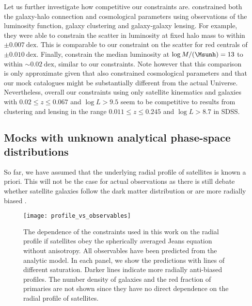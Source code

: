 \documentclass[fleqn,usenatbib,useAMS]{mnras}
\begin{document}
	Let us further investigate how competitive our constraints are. \cite{Cacciato+13} constrained both the galaxy-halo connection and cosmological parameters using observations of the luminosity function, galaxy clustering and galaxy-galaxy lensing. For example, they were able to constrain the scatter in luminosity at fixed halo mass to within $\pm 0.007 \ \mathrm{dex}$. This is comparable to our constraint on the scatter for red centrals of $\pm 0.010 \ \mathrm{dex}$. Finally, \cite{Cacciato+13} constrain the median luminosity at $\log M / (\Msunh) = 13$ to within $\sim 0.02 \ \mathrm{dex}$, similar to our constraints. Note however that this comparison is only approximate given that \cite{Cacciato+13} also constrained cosmological parameters and that our mock catalogues might be substantially different from the actual Universe. Nevertheless, overall our constraints using only satellite kinematics and galaxies with $0.02 \leq z \leq 0.067$ and $\log L > 9.5$ seem to be competitive to results from clustering and lensing in the range $0.011 \leq z \leq 0.245$ and $\log L > 8.7$ in SDSS.
	
	\subsection{Mocks with unknown analytical phase-space distributions}
	
	So far, we have assumed that the underlying radial profile of satellites is known a priori. This will not be the case for actual observations as there is still debate whether satellite galaxies follow the dark matter distribution \citep[e.g.,][]{vdMarel+00, vdBosch+05c, Tal+12, Cacciato+13, Guo+15a} or are more radially biased \citep[e.g.,][]{Yang+05, Chen08, More+09b, Hoshino+15}.
	\begin{figure*}
		\centering
		\texttt{[image: profile\_vs\_observables]}
		\caption{The dependence of the constraints used in this work on the radial profile if satellites obey the spherically averaged Jeans equation without anisotropy. All observables have been predicted from the analytic model. In each panel, we show the predictions with lines of different saturation. Darker lines indicate more radially anti-biased profiles. The number density of galaxies and the red fraction of primaries are not shown since they have no direct dependence on the radial profile of satellites.}
		\label{fig:profile_vs_observables}
	\end{figure*}
	
\end{document}
